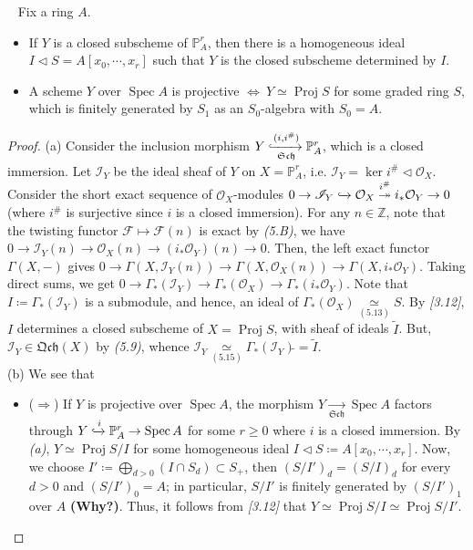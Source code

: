 \documentclass[11pt,a4paper,footinclude=true,headinclude=true]{scrbook} %
\DeclareMathOperator{\Spec}{Spec}
\DeclareMathOperator{\Proj}{Proj}
\newcommand{\FF}{\mathscr{F}}
\newcommand{\II}{\mathscr{I}}
\newcommand{\OO}{\mathcal{O}}
\newcommand{\PP}{\mathbb{P}}
\newcommand{\Sch}{\mathfrak{Sch}}
\newcommand{\<}{\langle}
\newcommand{\>}{\rangle}
\newcommand{\qcoh}{\mathfrak{Qch}}
\newenvironment{corollary}[2][]
{\renewcommand\theinnercustomcol{#2}\innercustomcol[#1]
\begin{mdframed}[backgroundcolor=gray!20]\ }
{\end{mdframed}\endinnercustomcol}
\begin{document}
\begin{corollary}{5.16}
    Fix a ring $A$.
    \begin{itemize}
        \item[(a)] If $Y$ is a closed subscheme of $\PP_A^r$, then there is a homogeneous ideal $I\triangleleft S=A[x_0,\cdots,x_r]$ such that $Y$ is the closed subscheme determined by $I$.
        \item[(b)] A scheme $Y$ over $\Spec A$ is projective $\Longleftrightarrow\ Y\simeq\Proj S$ for some graded ring $S$, which is finitely generated by $S_1$ as an $S_0$-algebra with $S_0=A$.
    \end{itemize}
\end{corollary}
\begin{proof}
    (a) Consider the inclusion morphism $Y\xhookrightarrow[\Sch]{(i,i^\#)}\PP_A^r$, which is a closed immersion. Let $\II_Y$ be the ideal sheaf of $Y$ on $X=\PP_A^r$, i.e. $\II_Y=\ker i^\#\triangleleft\OO_X$. Consider the short exact sequence of $\OO_X$-modules  $0\to\II_Y\xhookrightarrow{}\OO_X\overset{i^\#}{\twoheadrightarrow}i_\ast\OO_Y\to0$ (where $i^\#$ is surjective since $i$ is a closed immersion). For any $n\in\mathbb{Z}$, note that the twisting functor $\FF\mapsto\FF(n)$ is exact by \textit{(5.B)}, we have $0\to\II_Y(n)\to\OO_X(n)\to(i_\ast\OO_Y)(n)\to0$. Then, the left exact functor $\Gamma(X,-)$ gives $0\to\Gamma(X,\II_Y(n))\to\Gamma(X,\OO_X(n))\to\Gamma(X,i_\ast\OO_Y)$. Taking direct sums, we get $0\to\Gamma_\ast(\II_Y)\to\Gamma_\ast(\OO_X)\to\Gamma_\ast(i_\ast\OO_Y)$. Note that $I\coloneqq\Gamma_\ast(\II_Y)$ is a submodule, and hence, an ideal of $\Gamma_\ast(\OO_X)\underset{(5.13)}{\simeq}S$. By \textit{[3.12]}, $I$ determines a closed subscheme of $X=\Proj S$, with sheaf of ideals $\widetilde{I}$. But, $\II_Y\in\qcoh(X)$ by \textit{(5.9)}, whence $\II_Y\underset{(5.15)}{\simeq}\Gamma_\ast(\II_Y)\widetilde{}=\widetilde{I}$.\\
    \newline
    (b) We see that
    \begin{itemize}
        \item ($\Rightarrow$) If $Y$ is projective over $\Spec A$, the morphism $Y\xrightarrow[\Sch]{}\Spec A$ factors through $Y\xhookrightarrow{i}\PP_A^r\to\Spec A$ for some $r\geq0$ where $i$ is a closed immersion. By \textit{(a)}, $Y\simeq\Proj S/I$ for some homogeneous ideal $I\triangleleft S\coloneqq A[x_0,\cdots,x_r]$. Now, we choose $I'\coloneqq\bigoplus_{d>0}(I\cap S_d)\subset S_+$, then $(S/I')_d=(S/I)_d$ for every $d>0$ and $(S/I')_0=A$; in particular, $S/I'$ is finitely generated by $(S/I')_1$ over $A$ \textbf{(Why?)}. Thus, it follows from \textit{[3.12]} that $Y\simeq\Proj S/I\simeq\Proj S/I'$. 
        

\end{itemize}
\end{proof}
\end{document}

